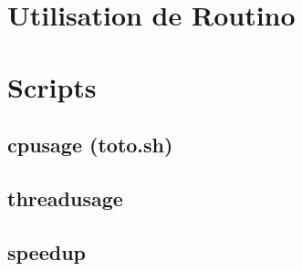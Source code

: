 \begin{appendices}
  \section{Utilisation de Routino}
  \label{ann:routino}

  \section{Scripts}
  \label{ann:scripts}
  \subsection{cpusage (toto.sh)}
  \label{ann:cpusage}
  \subsection{threadusage}
  \label{ann:threadusage}
  \subsection{speedup}
  \label{ann:speedup}
\end{appendices}
